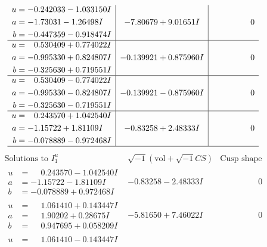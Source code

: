 \documentclass[1p]{elsarticle_modified}
\theoremstyle{definition}
\newcommand{\I}{\sqrt{-1}}
\begin{document}
$$\begin{array}{c|c|c}
\begin{aligned}
u &= -0.242033 - 1.033150 I \\
a &= -1.73031 - 1.26498 I \\
b &= -0.447359 - 0.918474 I\end{aligned}
 & -7.80679 + 9.01651 I & \phantom{-0.000000 } 0 \\ \hline\begin{aligned}
u &= \phantom{-}0.530409 + 0.774022 I \\
a &= -0.995330 + 0.824807 I \\
b &= -0.325630 + 0.719551 I\end{aligned}
 & -0.139921 + 0.875960 I & \phantom{-0.000000 } 0 \\ \hline\begin{aligned}
u &= \phantom{-}0.530409 - 0.774022 I \\
a &= -0.995330 - 0.824807 I \\
b &= -0.325630 - 0.719551 I\end{aligned}
 & -0.139921 - 0.875960 I & \phantom{-0.000000 } 0 \\ \hline\begin{aligned}
u &= \phantom{-}0.243570 + 1.042540 I \\
a &= -1.15722 + 1.81109 I \\
b &= -0.078889 - 0.972468 I\end{aligned}
 & -0.83258 + 2.48333 I & \phantom{-0.000000 } 0\\
 \hline 
 \end{array}$$\newpage$$\begin{array}{c|c|c}  
\text{Solutions to }I^u_{1}& \I (\text{vol} + \sqrt{-1}CS) & \text{Cusp shape}\\
 \hline 
\begin{aligned}
u &= \phantom{-}0.243570 - 1.042540 I \\
a &= -1.15722 - 1.81109 I \\
b &= -0.078889 + 0.972468 I\end{aligned}
 & -0.83258 - 2.48333 I & \phantom{-0.000000 } 0 \\ \hline\begin{aligned}
u &= \phantom{-}1.061410 + 0.143447 I \\
a &= \phantom{-}1.90202 + 0.28675 I \\
b &= \phantom{-}0.947695 + 0.058209 I\end{aligned}
 & -5.81650 + 7.46022 I & \phantom{-0.000000 } 0 \\ \hline\begin{aligned}
u &= \phantom{-}1.061410 - 0.143447 I \\

\end{aligned}
\end{array}$$
\end{document}
